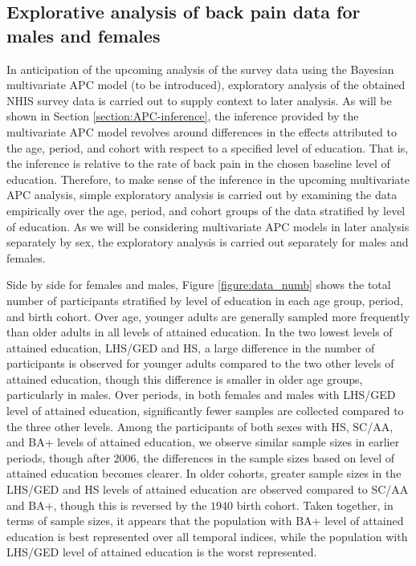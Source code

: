\subsection{Explorative analysis of back pain data for males and females}
\label{section:data:explorative}
In anticipation of the upcoming analysis of the survey data using the Bayesian multivariate APC model (to be introduced), exploratory analysis of the obtained NHIS survey data is carried out to supply context to later analysis. As will be shown in Section \ref{section:APC-inference}, the inference provided by the multivariate APC model revolves around differences in the effects attributed to the age, period, and cohort with respect to a specified level of education. That is, the inference is relative to the rate of back pain in the chosen baseline level of education. Therefore, to make sense of the inference in the upcoming multivariate APC analysis, simple exploratory analysis is carried out by examining the data empirically over the age, period, and cohort groups of the data stratified by level of education. As we will be considering multivariate APC models in later analysis separately by sex, the exploratory analysis is carried out separately for males and females.

Side by side for females and males, Figure \ref{figure:data_numb} shows the total number of participants stratified by level of education in each age group, period, and birth cohort. Over age, younger adults are generally sampled more frequently than older adults in all levels of attained education. In the two lowest levels of attained education, LHS/GED and HS, a large difference in the number of participants is observed for younger adults compared to the two other levels of attained education, though this difference is smaller in older age groups, particularly in males. Over periods, in both females and males with LHS/GED level of attained education, significantly fewer samples are collected compared to the three other levels. Among the participants of both sexes with HS, SC/AA, and BA+ levels of attained education, we observe similar sample sizes in earlier periods, though after $2006$, the differences in the sample sizes based on level of attained education becomes clearer. In older cohorts, greater sample sizes in the LHS/GED and HS levels of attained education are observed compared to SC/AA and BA+, though this is reversed by the $1940$ birth cohort. Taken together, in terms of sample sizes, it appears that the population with BA+ level of attained education is best represented over all temporal indices, while the population with LHS/GED level of attained education is the worst represented. 

